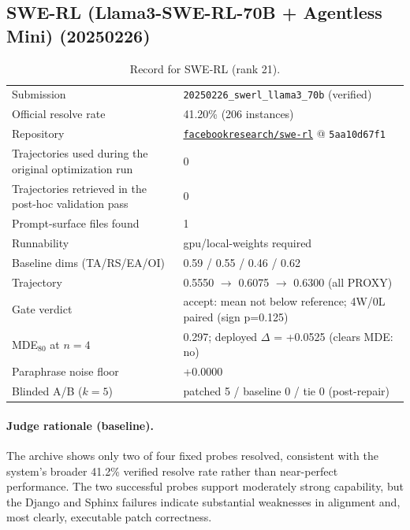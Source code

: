 \subsection{SWE-RL (Llama3-SWE-RL-70B + Agentless Mini) (20250226)}
\label{app:agent21}
\begin{table}[h]\centering\scriptsize
\caption{Record for SWE-RL (rank 21).}
\begin{tabular}{lp{8.2cm}}\toprule
Submission & \texttt{20250226\_\allowbreak{}swerl\_\allowbreak{}llama3\_\allowbreak{}70b} (verified) \\
Official resolve rate & 41.20\% (206 instances) \\
Repository & \href{https://github.com/facebookresearch/swe-rl}{\texttt{facebookresearch/swe-rl}} @ \texttt{5aa10d67f1} \\
Trajectories used during the original optimization run & 0 \\
Trajectories retrieved in the post-hoc validation pass & 0 \\
Prompt-surface files found & 1 \\
Runnability & gpu/local-weights required \\
Baseline dims (TA/RS/EA/OI) & 0.59 / 0.55 / 0.46 / 0.62 \\
Trajectory & 0.5550 $\to$ 0.6075 $\to$ 0.6300 (all PROXY) \\
Gate verdict & accept: mean not below reference; 4W/0L paired (sign p=0.125) \\
MDE$_{80}$ at $n{=}4$ & 0.297; deployed $\Delta$ = +0.0525 (clears MDE: no) \\
Paraphrase noise floor & +0.0000 \\
Blinded A/B ($k{=}5$) & patched 5 / baseline 0 / tie 0 (post-repair) \\
\bottomrule\end{tabular}\end{table}
\paragraph{Judge rationale (baseline).}
The archive shows only two of four fixed probes resolved, consistent with the system's broader 41.2\% verified resolve rate rather than near-perfect performance. The two successful probes support moderately strong capability, but the Django and Sphinx failures indicate substantial weaknesses in alignment and, most clearly, executable patch correctness.
